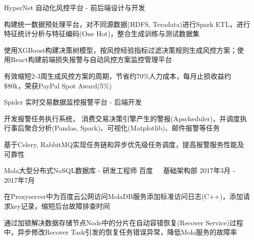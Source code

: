 \documentclass[11pt, a4paper, UTF8]{awesome-cv}
\begin{document}
\begin{cventries}
  \cventry
    {HyperNet 自动化风控平台 - 前后端设计与开发} %
    {} %
    {} %
    {\ } %
    {
      \begin{cvitems} %
        \item {构建统一数据预处理平台，对不同源数据(HDFS, Teradata)进行Spark ETL，进行特征统计分析与特征编码(One Hot)，整合生成训练与测试数据集}
        \item {使用XGBoost构建决策树模型，按风控经验指标过滤决策规则生成风控方案；使用React构建前端损失报警与自动风控方案监控管理平台}
        \item {有效缩短2-3周生成风控方案的周期，节省约70\%人力成本，每月止损收益约\$80k，荣获PayPal Spot Award(5\%)}
      \end{cvitems}
    }

  \cventry
    {Spider 实时交易数据监控报警平台 - 后端开发} %
    {} %
    {} %
    {\ } %
    {
      \begin{cvitems} %
        \item {开发报警任务执行系统， 消费交易决策引擎产生的警报(Apscheduler)，并调度执行事后聚合分析(Pandas, Spark)、可视化(Matplotlib)、邮件报警等任务}
        \item {基于Celery, RabbitMQ实现任务链和异步优先级任务调度，提高报警服务性能及可靠性}
      \end{cvitems}
    }
    
  \cventry
    {Mola大型分布式NoSQL数据库 - 研发工程师} %
    {百度{\ \cdotp\ \ }基础架构部} %
    {2017年3月 - 2017年7月} %
    {\ } %
    {
      \begin{cvitems} %
        \item {在Proxyserver中为百度云公网访问MolaDB服务添加标准访问日志(C++)，添加请求key记录，缩短后台故障排查时间}
        \item {通过加锁解决数据存储节点Node中的分片在自动容错恢复(Recover Service)过程中，异步修改Recover Task引发的恢复任务错误异常，降低Mola服务的故障率}
      \end{cvitems}
    }


\end{cventries}
\end{document}
